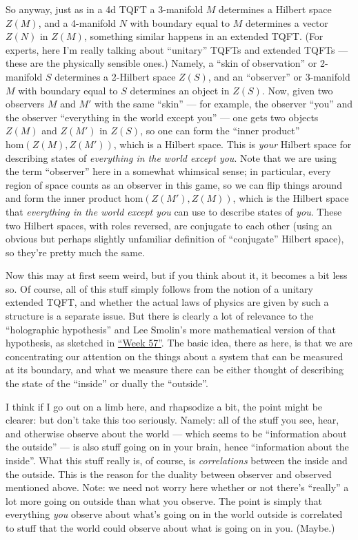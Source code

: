 \documentclass{article}
\begin{document}
So anyway, just as in a 4d TQFT a 3-manifold \(M\) determines a Hilbert
space \(Z(M)\), and a 4-manifold \(N\) with boundary equal to \(M\)
determines a vector \(Z(N)\) in \(Z(M)\), something similar happens in
an extended TQFT. (For experts, here I'm really talking about
``unitary'' TQFTs and extended TQFTs --- these are the physically
sensible ones.) Namely, a ``skin of observation'' or 2-manifold \(S\)
determines a 2-Hilbert space \(Z(S)\), and an ``observer'' or 3-manifold
\(M\) with boundary equal to \(S\) determines an object in \(Z(S)\).
Now, given two observers \(M\) and \(M'\) with the same ``skin'' --- for
example, the observer ``you'' and the observer ``everything in the world
except you'' --- one gets two objects \(Z(M)\) and \(Z(M')\) in
\(Z(S)\), so one can form the ``inner product''
\(\mathrm{hom}(Z(M),Z(M'))\), which is a Hilbert space. This is
\emph{your} Hilbert space for describing states of \emph{everything in
the world except you}. Note that we are using the term ``observer'' here
in a somewhat whimsical sense; in particular, every region of space
counts as an observer in this game, so we can flip things around and
form the inner product \(\mathrm{hom}(Z(M'),Z(M))\), which is the
Hilbert space that \emph{everything in the world except you} can use to
describe states of \emph{you}. These two Hilbert spaces, with roles
reversed, are conjugate to each other (using an obvious but perhaps
slightly unfamiliar definition of ``conjugate'' Hilbert space), so
they're pretty much the same.

Now this may at first seem weird, but if you think about it, it becomes
a bit less so. Of course, all of this stuff simply follows from the
notion of a unitary extended TQFT, and whether the actual laws of
physics are given by such a structure is a separate issue. But there is
clearly a lot of relevance to the ``holographic hypothesis'' and Lee
Smolin's more mathematical version of that hypothesis, as sketched in
\protect\hyperlink{week57}{``Week 57''}. The basic idea, there as here,
is that we are concentrating our attention on the things about a system
that can be measured at its boundary, and what we measure there can be
either thought of describing the state of the ``inside'' or dually the
``outside''.

I think if I go out on a limb here, and rhapsodize a bit, the point
might be clearer: but don't take this too seriously. Namely: all of the
stuff you see, hear, and otherwise observe about the world --- which
seems to be ``information about the outside'' --- is also stuff going on
in your brain, hence ``information about the inside''. What this stuff
really is, of course, is \emph{correlations} between the inside and the
outside. This is the reason for the duality between observer and
observed mentioned above. Note: we need not worry here whether or not
there's ``really'' a lot more going on outside than what you observe.
The point is simply that everything \emph{you} observe about what's
going on in the world outside is correlated to stuff that the world
could observe about what is going on in you. (Maybe.)
\end{document}
